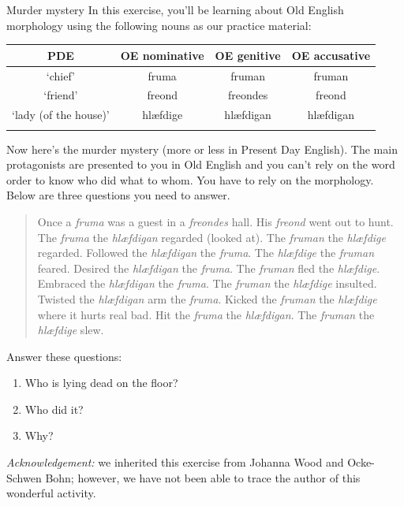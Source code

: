 \begin{exercises}{Murder mystery}\label{exercise-OE-murder}
In this exercise, you'll be learning about Old English morphology using the following nouns as our practice material: 

\begin{center}
\begin{tabular}{c@{}ccc}
 \lsptoprule
 \textbf{PDE} & \textbf{OE nominative} & \textbf{OE genitive} & \textbf{OE accusative}\\
 \midrule
 `chief' & fruma & fruman & fruman \\
 `friend' & freond & freondes & freond \\
 `lady (of the house)' & hlæfdige & hlæfdigan & hlæfdigan\\
 \lspbottomrule
\end{tabular}
\end{center}

\noindent Now here's the murder mystery (more or less in Present Day English). The main protagonists are presented to you in Old English and you can't rely on the word order to know who did what to whom. You have to rely on the morphology. Below are three questions you need to answer.

\begin{quote}
    Once a \emph{fruma} was a guest in a \emph{freondes} hall. His \emph{freond} went out to hunt. The \emph{fruma} the \emph{hlæfdigan} regarded (looked at). The \emph{fruman} the \emph{hlæfdige} regarded. Followed the \emph{hlæfdigan} the \emph{fruma}. The \emph{hlæfdige} the \emph{fruman} feared. Desired the \emph{hlæfdigan} the \emph{fruma}.  The \emph{fruman} fled the \emph{hlæfdige}. Embraced the \emph{hlæfdigan} the \emph{fruma}. The \emph{fruman} the \emph{hlæfdige} insulted. Twisted the \emph{hlæfdigan} arm the \emph{fruma}.  Kicked the \emph{fruman} the \emph{hlæfdige} where it hurts real bad. Hit the \emph{fruma} the \emph{hlæfdigan}. The \emph{fruman} the \emph{hlæfdige} slew.
\end{quote}

\noindent Answer these questions:
\begin{enumerate}
    \item Who is lying dead on the floor?
    \item Who did it?
    \item Why?
\end{enumerate}

\noindent\emph{Acknowledgement:} we inherited this exercise from Johanna Wood and Ocke-Schwen Bohn; however, we have not been able to trace the author of this wonderful activity.

\end{exercises}

